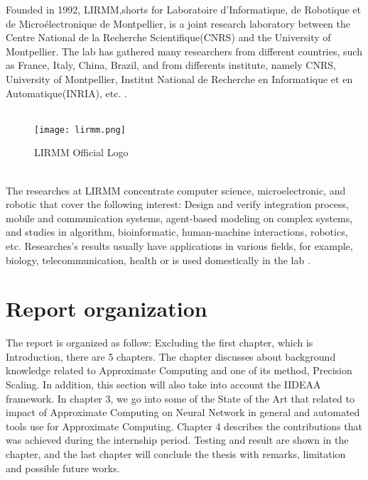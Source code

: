 Founded in 1992, LIRMM,shorts for Laboratoire d'Informatique, de Robotique et de Microélectronique de Montpellier, is a joint research laboratory between the Centre National de la Recherche Scientifique(CNRS) and the University of Montpellier. The lab has gathered many researchers from different countries, such as France, Italy, China, Brazil, and from differents institute, namely CNRS, University of Montpellier, Institut National de Recherche en Informatique et en Automatique(INRIA), etc. \cite{LIRMM}.~\\
~\\
\begin{figure}[h]
\texttt{[image: lirmm.png]}
\centering
\caption{LIRMM Official Logo}
\end{figure}
~\\
The researches at LIRMM concentrate computer science, microelectronic, and robotic that cover the following interest: Design and verify integration process, mobile and communication systems, agent-based modeling on complex systems, and studies in algorithm, bioinformatic, human-machine interactions, robotics, etc. Researches's results usually have applications in various fields, for example, biology, telecommunication, health or is used domestically in the lab \cite{LIRMM}. ~\\ 
\vspace*{3cm}


\section{Report organization}

The report is organized as follow: Excluding the first chapter, which is Introduction, there are 5 chapters. The  chapter discusses about background knowledge related to Approximate Computing and one of its method, Precision Scaling. In addition, this section will also take into account the IIDEAA framework. In chapter 3, we go into some of the State of the Art that related to impact of Approximate Computing on Neural Network in general and automated tools use for Approximate Computing.  Chapter 4 describes the contributions that was achieved during the internship period. Testing and result are shown in the  chapter, and the last chapter will conclude the thesis with remarks, limitation and possible future works. 